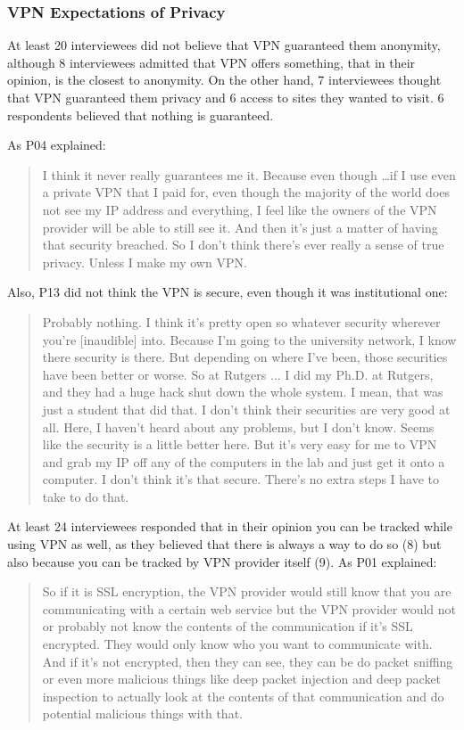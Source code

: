 \subsubsection{VPN Expectations of Privacy}
At least 20 interviewees did not believe that VPN guaranteed them anonymity, although 8 interviewees admitted that VPN offers something, that in their opinion, is the closest to anonymity. On the other hand, 7 interviewees thought that VPN guaranteed them privacy and 6 access to sites they wanted to visit. 6 respondents believed that nothing is guaranteed.

As P04 explained:
\begin{quote}I think it never really guarantees me it. Because even though \dots if I use even a private VPN that I paid for, even though the majority of the world does not see my IP address and everything, I feel like the owners of the VPN provider will be able to still see it. And then it's just a matter of having that security breached. So I don't think there's ever really a sense of true privacy. Unless I make my own VPN.\end{quote}


Also, P13 did not think the VPN is secure, even though it was institutional one:
\begin{quote}Probably nothing. I think it's pretty open so whatever security wherever you're [inaudible] into. Because I'm going to the university network, I know there security is there. But depending on where I've been, those securities have been better or worse. So at Rutgers ... I did my Ph.D. at Rutgers, and they had a huge hack shut down the whole system. I mean, that was just a student that did that. I don't think their securities are very good at all. Here, I haven't heard about any problems, but I don't know. Seems like the security is a little better here. But it's very easy for me to VPN and grab my IP off any of the computers in the lab and just get it onto a computer. I don't think it's that secure. There's no extra steps I have to take to do that.\end{quote}


At least 24 interviewees responded that in their opinion you can be tracked while using VPN as well, as they believed that there is always a way to do so (8) but also because you can be tracked by VPN provider itself (9). 
As P01 explained:

\begin{quote}So if it is SSL encryption, the VPN provider would still know that you are communicating with a certain web service but the VPN provider would not or probably not know the contents of the communication if it's SSL encrypted. They would only know who you want to communicate with. And if it's not encrypted, then they can see, they can be do packet sniffing or even more malicious things like deep packet injection and deep packet inspection to actually look at the contents of that communication and do potential malicious things with that. \end{quote}

